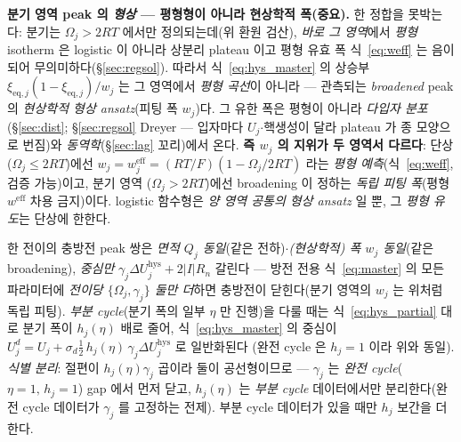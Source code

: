 \documentclass[11pt,a4paper]{article}
\newcommand{\eff}{\mathrm{eff}}
\newcommand{\eq}{\mathrm{eq}}
\newcommand{\hys}{\mathrm{hys}}
\begin{document}
\textbf{분기 영역 peak 의 \emph{형상} — 평형형이 아니라 현상학적 폭(중요).} 한 정합을 못박는다: 분기는
$\Omega_j>2RT$ 에서만 정의되는데(위 환원 검산), \emph{바로 그 영역}에서 \emph{평형} isotherm 은 logistic 이 아니라
상분리 plateau 이고 평형 유효 폭 식~\eqref{eq:weff} 는 음이 되어 무의미하다(\S\ref{sec:regsol}). 따라서
식~\eqref{eq:hys_master} 의 상승부 $\xi_{\eq,j}(1-\xi_{\eq,j})/w_j$ 는 그 영역에서 \emph{평형 곡선}이 아니라 — 관측되는
\emph{broadened} peak 의 \emph{현상학적 형상 ansatz}(피팅 폭 $w_j$)다. 그 유한 폭은 평형이 아니라 \emph{다입자 분포}
(\S\ref{sec:dist}; \S\ref{sec:regsol} Dreyer — 입자마다 $U_j$$\cdot$핵생성이 달라 plateau 가 종 모양으로 번짐)와
\emph{동역학}(\S\ref{sec:lag} 꼬리)에서 온다. \textbf{즉 $w_j$ 의 지위가 두 영역서 다르다}: 단상($\Omega_j\le2RT$)에선
$w_j=w_j^\eff=(RT/F)(1-\Omega_j/2RT)$ 라는 \emph{평형 예측}(식~\eqref{eq:weff}, 검증 가능)이고, 분기 영역
($\Omega_j>2RT$)에선 broadening 이 정하는 \emph{독립 피팅 폭}(평형 $w^\eff$ 차용 금지)이다. logistic 함수형은
\emph{양 영역 공통의 형상 ansatz} 일 뿐, 그 \emph{평형 유도}는 단상에 한한다.

한 전이의 충방전 peak 쌍은 \emph{면적 $Q_j$ 동일}(같은 전하)$\cdot$\emph{(현상학적) 폭 $w_j$ 동일}(같은 broadening),
\emph{중심만} $\gamma_j\Delta U_j^\hys+2|I|R_n$ 갈린다 — 방전 전용 식~\eqref{eq:master} 의 모든 파라미터에
\emph{전이당 $\{\Omega_j,\gamma_j\}$ 둘만 더}하면 충방전이 닫힌다(분기 영역의 $w_j$ 는 위처럼 독립 피팅).
\emph{부분 cycle}(분기 폭의 일부 $\eta$ 만 진행)을 다룰 때는 식~\eqref{eq:hys_partial} 대로 분기 폭이 $h_j(\eta)$ 배로
줄어, 식~\eqref{eq:hys_master} 의 중심이 $U_j^{d}=U_j+\sigma_d\tfrac12\,h_j(\eta)\,\gamma_j\Delta U_j^\hys$ 로 일반화된다
(완전 cycle 은 $h_j=1$ 이라 위와 동일). \emph{식별 분리}: 절편이 $h_j(\eta)\gamma_j$ 곱이라 둘이 공선형이므로 — $\gamma_j$ 는
\emph{완전 cycle}($\eta=1,\,h_j=1$) gap 에서 먼저 닫고, $h_j(\eta)$ 는 \emph{부분 cycle} 데이터에서만 분리한다(완전
cycle 데이터가 $\gamma_j$ 를 고정하는 전제). 부분 cycle 데이터가 있을 때만 $h_j$ 보간을 더한다.
\end{document}
